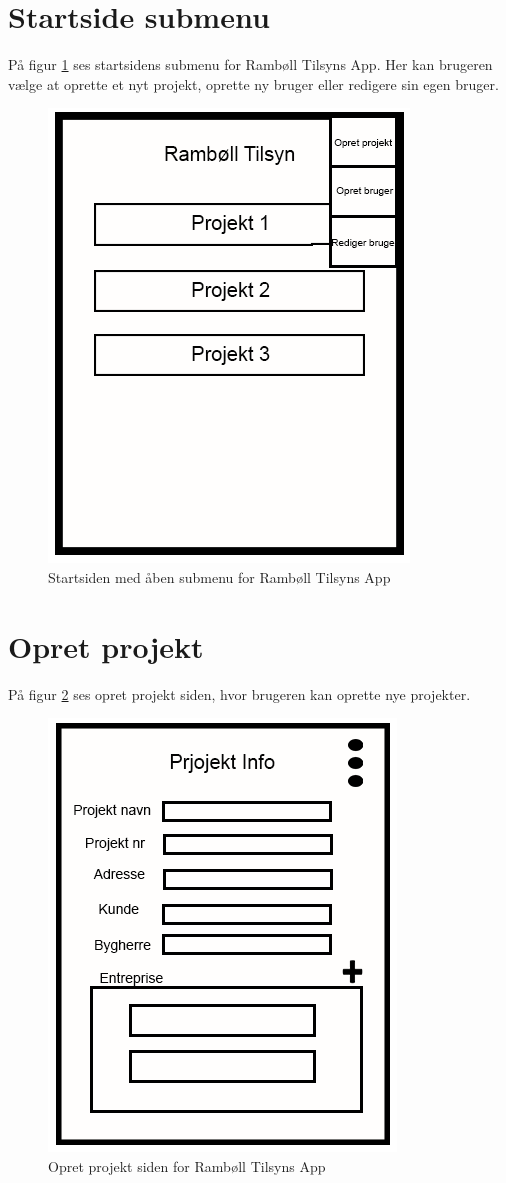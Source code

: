 \section{Startside submenu}\label{sec:StartSubMock}
På figur \ref{fig:StartSubMock} ses startsidens submenu for Rambøll Tilsyns App. Her kan brugeren vælge at oprette et nyt projekt, oprette ny bruger eller redigere sin egen bruger.

\begin{figure}[H]
	\centering
	\includegraphics[width=0.4\linewidth]{MockUps/Mock/Ramboell-Startside-Sub}
	\caption{Startsiden med åben submenu for Rambøll Tilsyns App}
	\label{fig:StartSubMock}
\end{figure}

\clearpage

\section{Opret projekt}\label{sec:OpretProjektMock}
På figur \ref{fig:OpretProjektMock} ses opret projekt siden, hvor brugeren kan oprette nye projekter.

\begin{figure}[H]
	\centering
	\includegraphics[width=0.4\linewidth]{MockUps/Mock/Ramboell-ProjektInfo}
	\caption{Opret projekt siden for Rambøll Tilsyns App}
	\label{fig:OpretProjektMock}
\end{figure}

